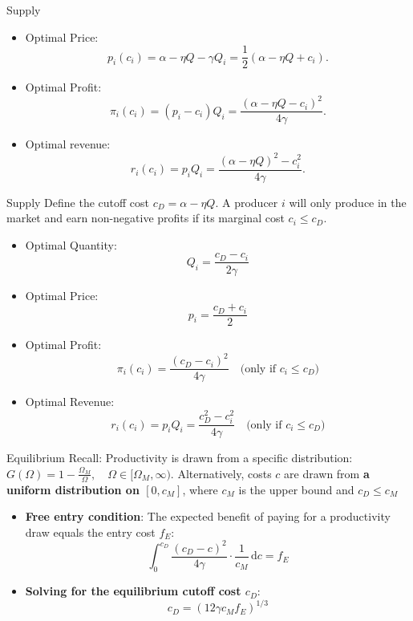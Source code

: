 \documentclass[aspectratio=169]{beamer}  %
\begin{document}
\begin{frame}{Supply}
    \begin{itemize}
        \item Optimal Price:
        \[
        p_i(c_i) = \alpha - \eta Q - \gamma Q_i = \frac{1}{2} (\alpha - \eta Q + c_i).
        \]
        \item Optimal Profit:
        \[
        \pi_i(c_i) = (p_i - c_i) Q_i = \frac{(\alpha - \eta Q - c_i)^2}{4\gamma}.  
        \]
        \item Optimal revenue:
        \[
        r_i(c_i) = p_i Q_i = \frac{(\alpha - \eta Q)^2 - c_i^2}{4\gamma}.
        \]
    \end{itemize}
\end{frame}

\begin{frame}{Supply}
    Define the cutoff cost \(c_D = \alpha - \eta Q \). A producer \(i\) will only produce in the market and earn non-negative profits if its marginal cost \( c_i \leq c_D \).\\
    \begin{itemize}
        \item Optimal Quantity:  
        \[
          Q_i = \frac{c_D - c_i}{2\gamma}
        \]
        \item Optimal Price:  
        \[
          p_i = \frac{c_D + c_i}{2}
        \]
        \item Optimal Profit:  
        \[
          \pi_i(c_i) = \frac{(c_D - c_i)^2}{4\gamma} \quad \text{(only if } c_i \leq c_D\text{)}
        \]
        \item Optimal Revenue:
        \[
        r_i(c_i) = p_i Q_i = \frac{c_D^2 - c_i^2}{4\gamma} \quad \text{(only if } c_i \leq c_D\text{)}
        \]
    \end{itemize}
\end{frame}

\begin{frame}{Equilibrium}
    Recall: Productivity is drawn from a specific distribution: \(G(\Omega) = 1 - \frac{\Omega_M}{\Omega}, \quad \Omega \in [\Omega_M, \infty)\). Alternatively, costs \(c\) are drawn from \textbf{a uniform distribution on \([0, c_M]\)}, where \(c_M\) is the upper bound and \(c_D \leq c_M\)
    \begin{itemize}
        \item \textbf{Free entry condition}: The expected benefit of paying for a productivity draw equals the entry cost \(f_E\):
        \[
        \int_{0}^{c_{D}} \frac{(c_{D} - c)^{2}}{4\gamma} \cdot \frac{1}{c_{M}} \, \mathrm{d}c = f_{E}
        \]
        \item \textbf{Solving for the equilibrium cutoff cost \(c_D\)}:
        \[
        c_D = (12 \gamma c_{M} f_{E})^{1/3}
        \]
    \end{itemize}
\end{frame}
\end{document}
